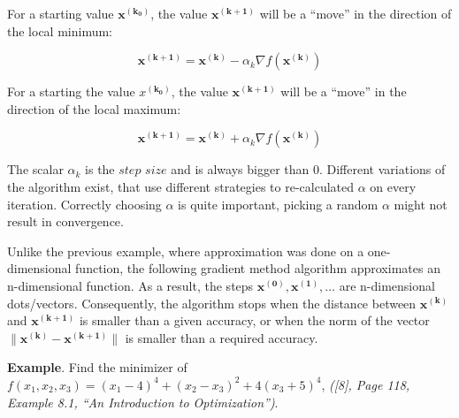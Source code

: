 \documentclass[11pt]{article}
\begin{document}
For a starting value \(\pmb{x^{(k_0)}}\), the value \(\pmb{x^{(k+1)}}\)
will be a ``move'' in the direction of the local minimum:

\[
\pmb{x^{(k+1)}} = \pmb{x^{(k)}} - \alpha_k \nabla f(\pmb{x^{(k)}})
\]

For a starting the value \(x\pmb{^{(k_0)}}\), the value
\(\pmb{x^{(k+1)}}\) will be a ``move'' in the direction of the local
maximum:

\[
\pmb{x^{(k+1)}} = \pmb{x^{(k)}} + \alpha_k \nabla f(\pmb{x^{(k)}})
\]

The scalar \(\alpha_k\) is the \(\textit{step size}\) and is always
bigger than 0. Different variations of the algorithm exist, that use
different strategies to re-calculated \(\alpha\) on every iteration.
Correctly choosing \(\alpha\) is quite important, picking a random
\(\alpha\) might not result in convergence.

Unlike the previous example, where approximation was done on a
one-dimensional function, the following gradient method algorithm
approximates an n-dimensional function. As a result, the steps
\(\pmb{x^{(0)}}, \pmb{x^{(1)}}, \ldots\) are n-dimensional dots/vectors.
Consequently, the algorithm stops when the distance between
\(\pmb{x^{(k)}}\) and \(\pmb{x^{(k+1)}}\) is smaller than a given
accuracy, or when the norm of the vector
\(\| \pmb{x^{(k)}} - \pmb{x^{(k+1)}} \|\) is smaller than a required
accuracy.

\textbf{Example}. Find the minimizer of
\(f(x_1, x_2, x_3) = (x_1 - 4)^4 + (x_2 - x_3)^2 + 4(x_3 + 5)^4\),
\emph{({[}8{]}, Page 118, Example 8.1, ``An Introduction to
Optimization'')}.
\end{document}
